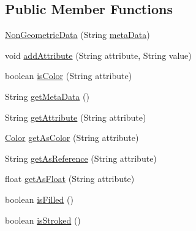 \subsection*{Public Member Functions}
\begin{DoxyCompactItemize}
\item 
\mbox{\hyperlink{classorg_1_1newdawn_1_1slick_1_1svg_1_1_non_geometric_data_a4349e32bb3c859d2a19dca9a941f75af}{Non\+Geometric\+Data}} (String \mbox{\hyperlink{classorg_1_1newdawn_1_1slick_1_1svg_1_1_non_geometric_data_ab9720408fbd609767acb6528999a3f8d}{meta\+Data}})
\item 
void \mbox{\hyperlink{classorg_1_1newdawn_1_1slick_1_1svg_1_1_non_geometric_data_adfa186ba29a3db6f3210a861e5e55a45}{add\+Attribute}} (String attribute, String value)
\item 
boolean \mbox{\hyperlink{classorg_1_1newdawn_1_1slick_1_1svg_1_1_non_geometric_data_a3712fb62547b297f7d08259682fc2d90}{is\+Color}} (String attribute)
\item 
String \mbox{\hyperlink{classorg_1_1newdawn_1_1slick_1_1svg_1_1_non_geometric_data_ad054d28cdc3c4070707e0b92b3e5ed0a}{get\+Meta\+Data}} ()
\item 
String \mbox{\hyperlink{classorg_1_1newdawn_1_1slick_1_1svg_1_1_non_geometric_data_af14f4628737e3da9379ac25e0a56a92d}{get\+Attribute}} (String attribute)
\item 
\mbox{\hyperlink{classorg_1_1newdawn_1_1slick_1_1_color}{Color}} \mbox{\hyperlink{classorg_1_1newdawn_1_1slick_1_1svg_1_1_non_geometric_data_a68187f6636101be64001bc748c04ef44}{get\+As\+Color}} (String attribute)
\item 
String \mbox{\hyperlink{classorg_1_1newdawn_1_1slick_1_1svg_1_1_non_geometric_data_a7b5d3b3acd6be8061d53de032c9d5817}{get\+As\+Reference}} (String attribute)
\item 
float \mbox{\hyperlink{classorg_1_1newdawn_1_1slick_1_1svg_1_1_non_geometric_data_a67a551dc7a2ce368d247d0db71dadf05}{get\+As\+Float}} (String attribute)
\item 
boolean \mbox{\hyperlink{classorg_1_1newdawn_1_1slick_1_1svg_1_1_non_geometric_data_a9196c42840196638b0a4b694c09cd238}{is\+Filled}} ()
\item 
boolean \mbox{\hyperlink{classorg_1_1newdawn_1_1slick_1_1svg_1_1_non_geometric_data_a5d09ec586ae4d082566bfe815b6e41c7}{is\+Stroked}} ()
\end{DoxyCompactItemize}
